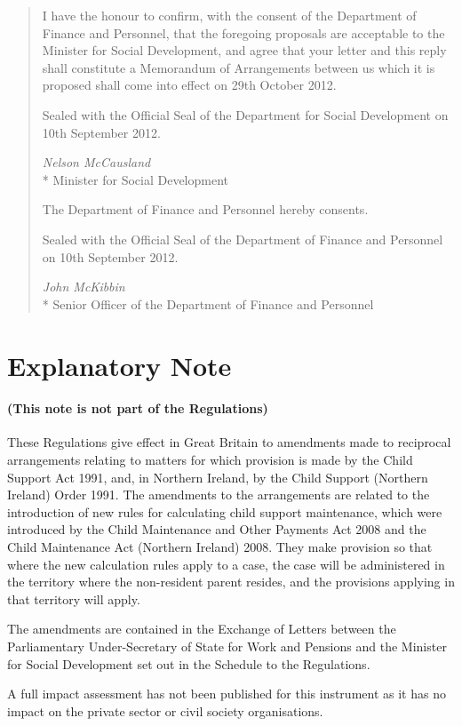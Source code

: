 \documentclass[12pt,a4paper]{article}
\begin{document}
\begin{quotation}
I have the honour to confirm, with the consent of the Department of Finance and Personnel, that the foregoing proposals are acceptable to the Minister for Social Development, and agree that your letter and this reply shall constitute a Memorandum of Arrangements between us which it is proposed shall come into effect on 29th October 2012.

\bigskip

\pagebreak[3]

Sealed with the Official Seal of the Department for Social Development on 10th September 2012.

{\raggedleft
\emph{Nelson McCausland}\\*
Minister for Social Development

}

\bigskip

\pagebreak[3]

The Department of Finance and Personnel hereby consents.

Sealed with the Official Seal of the Department of Finance and Personnel on 10th September 2012.

{\raggedleft
\emph{John McKibbin}\\*
Senior Officer of the Department of Finance and Personnel

}

\end{quotation}

\part{Explanatory Note}

\renewcommand\parthead{— Explanatory Note}

\subsection*{(This note is not part of the Regulations)}

These Regulations give effect in Great Britain to amendments made to reciprocal arrangements relating to matters for which provision is made by the Child Support Act 1991, and, in Northern Ireland, by the Child Support (Northern Ireland) Order 1991. The amendments to the arrangements are related to the introduction of new rules for calculating child support maintenance, which were introduced by the Child Maintenance and Other Payments Act 2008 and the Child Maintenance Act (Northern Ireland) 2008. They make provision so that where the new calculation rules apply to a case, the case will be administered in the territory where the non-resident parent resides, and the provisions applying in that territory will apply.

The amendments are contained in the Exchange of Letters between the Parliamentary Under-Secretary of State for Work and Pensions and the Minister for Social Development set out in the Schedule to the Regulations.

A full impact assessment has not been published for this instrument as it has no impact on the private sector or civil society organisations. 
\end{document}
